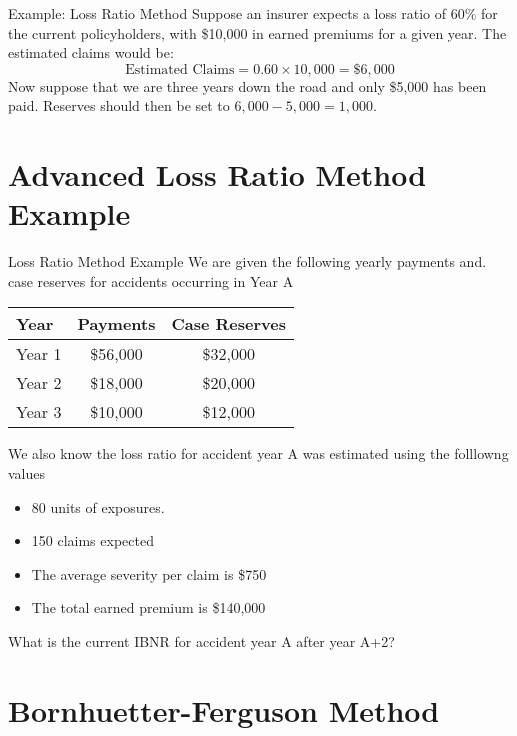 \documentclass[compress,mathserif]{beamer}
\begin{document}
\begin{frame}{Example: Loss Ratio Method}
    Suppose an insurer expects a loss ratio of 60\% for the current policyholders, with \$10,000 in earned premiums for a given year. The estimated claims would be:
    \[ \text{Estimated Claims} = 0.60 \times 10,000 = \$6,000 \]
Now suppose that we are three years down the road and only \$5,000 has been paid. Reserves should then be set to $6,000 - 5,000 = 1,000$. 
\end{frame}

\section{Advanced Loss Ratio Method Example}

\begin{frame}{Loss Ratio Method Example}
 We are given the following yearly payments and. case reserves for accidents occurring in Year A

    \begin{table}
    \centering
    \begin{tabular}{lcc}
    Year & Payments & Case Reserves \\ \hline
    Year 1 & \$56,000 & \$32,000 \\
    Year 2 & \$18,000 & \$20,000 \\
    Year 3 & \$10,000 & \$12,000 \\
    \end{tabular}
    \end{table}

    We also know the loss ratio for accident year A was estimated using the folllowng values
    \begin{itemize}
    \item 80 units of exposures. 
    \item 150 claims expected
    \item The average severity per claim is \$750
    \item The total earned premium is \$140,000
    \end{itemize}
    What is the current IBNR for accident year A after year A+2?
   
\end{frame}


\section{Bornhuetter-Ferguson Method}
\end{document}
